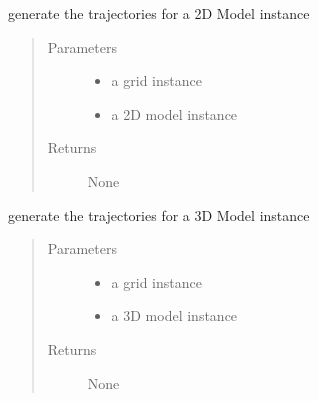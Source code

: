 \documentclass[letterpaper,10pt,english]{sphinxmanual}
\begin{document}

\begin{fulllineitems}
\label{\detokenize{octapy:octapy.tracking.run_2d_model}}
\sphinxAtStartPar
generate the trajectories for a 2D Model instance
\begin{quote}\begin{description}
\item[{Parameters}] \leavevmode\begin{itemize}
\item {} 
\sphinxAtStartPar
{} \textendash{} a grid instance

\item {} 
\sphinxAtStartPar
{} \textendash{} a 2D model instance

\end{itemize}

\item[{Returns}] \leavevmode
\sphinxAtStartPar
None

\end{description}\end{quote}

\end{fulllineitems}


\begin{fulllineitems}
\label{\detokenize{octapy:octapy.tracking.run_3d_model}}
\sphinxAtStartPar
generate the trajectories for a 3D Model instance
\begin{quote}\begin{description}
\item[{Parameters}] \leavevmode\begin{itemize}
\item {} 
\sphinxAtStartPar
{} \textendash{} a grid instance

\item {} 
\sphinxAtStartPar
{} \textendash{} a 3D model instance

\end{itemize}

\item[{Returns}] \leavevmode
\sphinxAtStartPar
None

\end{description}\end{quote}

\end{fulllineitems}
\end{document}
